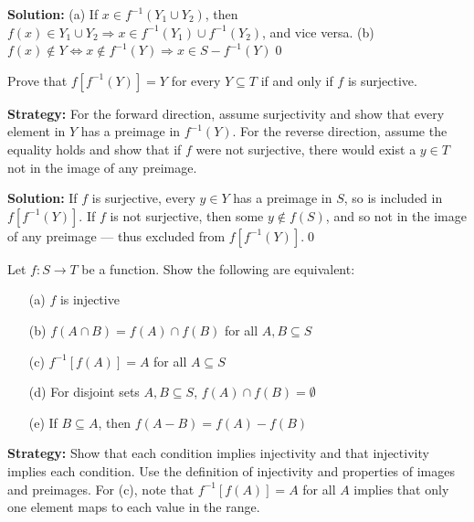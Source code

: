 \noindent\bigskip\noindent\textbf{Solution:}  
(a) If \( x \in f^{-1}(Y_1 \cup Y_2) \), then \( f(x) \in Y_1 \cup Y_2 \Rightarrow x \in f^{-1}(Y_1) \cup f^{-1}(Y_2) \), and vice versa.  
(b) \( f(x) \notin Y \iff x \notin f^{-1}(Y) \Rightarrow x \in S - f^{-1}(Y) \)\qed



\begin{problembox}
\begin{problemstatement}
Prove that \( f[f^{-1}(Y)] = Y \) for every \( Y \subseteq T \) if and only if \( f \) is surjective.
\end{problemstatement}
\end{problembox}

\noindent\textbf{Strategy:} For the forward direction, assume surjectivity and show that every element in $Y$ has a preimage in $f^{-1}(Y)$. For the reverse direction, assume the equality holds and show that if $f$ were not surjective, there would exist a $y \in T$ not in the image of any preimage.

\noindent\bigskip\noindent\textbf{Solution:}  
If \( f \) is surjective, every \( y \in Y \) has a preimage in \( S \), so is included in \( f[f^{-1}(Y)] \).  
If \( f \) is not surjective, then some \( y \notin f(S) \), and so not in the image of any preimage — thus excluded from \( f[f^{-1}(Y)] \).\qed



\begin{problembox}
\begin{problemstatement}
Let \( f: S \to T \) be a function. Show the following are equivalent:
\begin{itemize}
\item[(a)] \( f \) is injective
\item[(b)] \( f(A \cap B) = f(A) \cap f(B) \) for all \( A, B \subseteq S \)
\item[(c)] \( f^{-1}[f(A)] = A \) for all \( A \subseteq S \)
\item[(d)] For disjoint sets \( A, B \subseteq S \), \( f(A) \cap f(B) = \emptyset \)
\item[(e)] If \( B \subseteq A \), then \( f(A - B) = f(A) - f(B) \)
\end{itemize}
\end{problemstatement}
\end{problembox}

\noindent\textbf{Strategy:} Show that each condition implies injectivity and that injectivity implies each condition. Use the definition of injectivity and properties of images and preimages. For (c), note that $f^{-1}[f(A)] = A$ for all $A$ implies that only one element maps to each value in the range.

